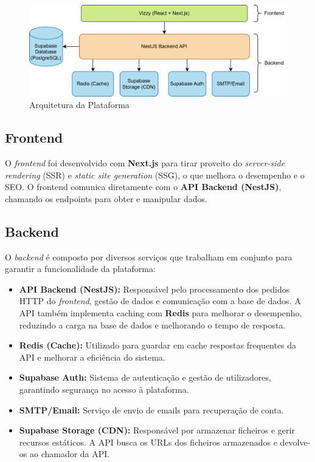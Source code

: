 \documentclass[a4paper, 12pt]{article} %
\begin{document}
\begin{figure}[ht]
	\centering
	\includegraphics[width=\textwidth]{../images/system-architecture.png}
	\caption{Arquitetura da Plataforma}
	\label{fig:arquitetura}
\end{figure}

\subsection{Frontend}
O \textit{frontend} foi desenvolvido com \textbf{Next.js} para tirar proveito do \textit{server-side rendering} (SSR) e \textit{static site generation} (SSG), o que melhora o desempenho e o SEO. O frontend comunica diretamente com o \textbf{API Backend (NestJS)}, chamando os endpoints para obter e manipular dados.

\subsection{Backend}
O \textit{backend} é composto por diversos serviços que trabalham em conjunto para garantir a funcionalidade da plataforma:

\begin{itemize}
	\item \textbf{API Backend (NestJS):} Responsável pelo processamento dos pedidos HTTP do \textit{frontend}, gestão de dados e comunicação com a base de dados. A API também implementa caching com \textbf{Redis} para melhorar o desempenho, reduzindo a carga na base de dados e melhorando o tempo de resposta.
	\item \textbf{Redis (Cache):} Utilizado para guardar em cache respostas frequentes da API e melhorar a eficiência do sistema.
	\item \textbf{Supabase Auth:} Sistema de autenticação e gestão de utilizadores, garantindo segurança no acesso à plataforma.
	\item \textbf{SMTP/Email:} Serviço de envio de emails para recuperação de conta.
	\item \textbf{Supabase Storage (CDN):} Responsável por armazenar ficheiros e gerir recursos estáticos. A API busca os URLs dos ficheiros armazenados e devolve-os ao chamador da API.
\end{itemize}
\end{document}
